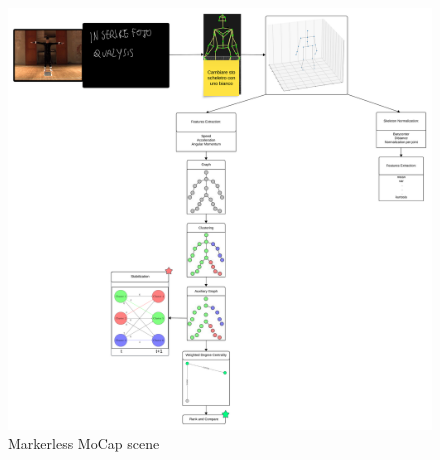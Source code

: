 \begin{figure}[H]
    \centering
    \includegraphics[width=\textwidth]{graphics/Walkthrough.png}
    \caption{Markerless MoCap scene}
    \label{fig:walktrough}
\end{figure}